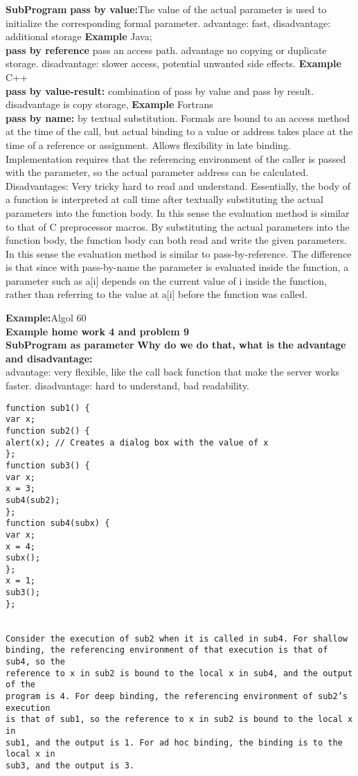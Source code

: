 \documentclass{article}
\begin{document}
\tiny
\textbf{SubProgram}
\textbf{pass by value:}The value of the actual parameter is used to initialize the corresponding formal parameter. advantage: fast, disadvantage: additional storage
\textbf{Example} Java;\\
\textbf{pass by reference} pass an access path. advantage no copying or duplicate storage. disadvantage: slower access, potential unwanted side effects.
\textbf{Example} C++\\
\textbf{pass by value-result:} combination of pass by value and pass by result. disadvantage is copy storage, 
\textbf{Example} Fortrans\\
\textbf{pass by name:} by textual substitution. Formals are bound to an access method at the time of the call, but actual binding to a value or address takes place at the time of a reference or assignment. Allows flexibility in late binding. Implementation requires that the referencing environment of the caller is passed with the parameter, so the actual parameter address can be calculated. Disadvantages: Very tricky hard to read and understand. Essentially, the body of a function is interpreted at call time after textually substituting the actual parameters into the function body. In this sense the evaluation method is similar to that of C preprocessor macros.
By substituting the actual parameters into the function body, the function body can both read and write the given parameters. In this sense the evaluation method is similar to pass-by-reference. The difference is that since with pass-by-name the parameter is evaluated inside the function, a parameter such as a[i] depends on the current value of i inside the function, rather than referring to the value at a[i] before the function was called.


\textbf{Example:}Algol 60 \\

\textbf{Example home work 4 and problem 9}\\

\textbf{SubProgram as parameter}
\textbf{Why do we do that, what is the advantage and disadvantage:}\\
advantage: very flexible, like the call back function that make the server works faster.
disadvantage: hard to understand, bad readability. 

\begin{lstlisting}
function sub1() {
var x;
function sub2() {
alert(x); // Creates a dialog box with the value of x
};
function sub3() {
var x;
x = 3;
sub4(sub2);
};
function sub4(subx) {
var x;
x = 4;
subx();
};
x = 1;
sub3();
};


Consider the execution of sub2 when it is called in sub4. For shallow
binding, the referencing environment of that execution is that of sub4, so the
reference to x in sub2 is bound to the local x in sub4, and the output of the
program is 4. For deep binding, the referencing environment of sub2’s execution
is that of sub1, so the reference to x in sub2 is bound to the local x in
sub1, and the output is 1. For ad hoc binding, the binding is to the local x in
sub3, and the output is 3.

\end{lstlisting}
\end{document}
